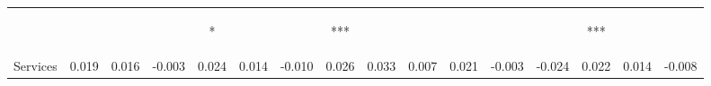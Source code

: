 \begin{tabular}{lccccccccccccccc}
 & \begin{footnotesize}[0.017]\end{footnotesize} & \begin{footnotesize}[0.022]\end{footnotesize} & \begin{footnotesize}[0.025]\end{footnotesize} & \begin{footnotesize}[0.014]*\end{footnotesize} & \begin{footnotesize}[0.024]\end{footnotesize} & \begin{footnotesize}[0.028]\end{footnotesize} & \begin{footnotesize}[0.015]***\end{footnotesize} & \begin{footnotesize}[0.023]\end{footnotesize} & \begin{footnotesize}[0.027]\end{footnotesize} & \begin{footnotesize}[0.012]\end{footnotesize} & \begin{footnotesize}[0.014]\end{footnotesize} & \begin{footnotesize}[0.018]\end{footnotesize} & \begin{footnotesize}[0.008]***\end{footnotesize} & \begin{footnotesize}[0.015]\end{footnotesize} & \begin{footnotesize}[0.016]\end{footnotesize}\\
\noalign{\smallskip}Services & 0.019 & 0.016 & -0.003 & 0.024 & 0.014 & -0.010 & 0.026 & 0.033 & 0.007 & 0.021 & -0.003 & -0.024 & 0.022 & 0.014 & -0.008\\

\end{tabular}
